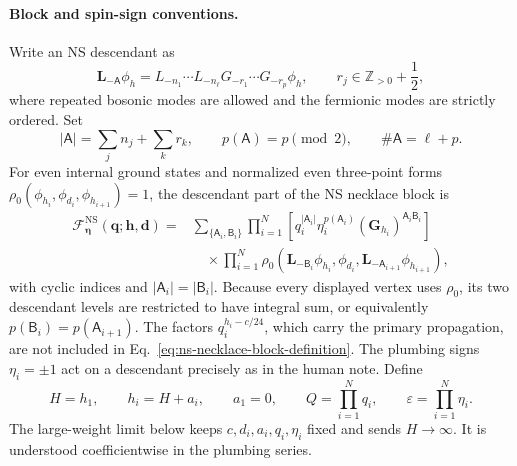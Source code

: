 \documentclass[11pt]{article}
\newcommand{\NS}{\mathrm{NS}}
\newcommand{\F}{\mathcal F}
\begin{document}
\paragraph{Block and spin-sign conventions.}
Write an NS descendant as
\begin{equation}
 \mathbf L_{-\mathsf A}\phi_h
 =L_{-n_1}\cdots L_{-n_\ell}
  G_{-r_1}\cdots G_{-r_p}\phi_h,
 \qquad
 r_j\in\mathbb Z_{>0}+\frac12,
 \label{eq:ns-necklace-pbw-state}
\end{equation}
where repeated bosonic modes are allowed and the fermionic modes are
strictly ordered.  Set
\begin{equation}
 |\mathsf A|=\sum_j n_j+\sum_k r_k,
 \qquad
 p(\mathsf A)=p\pmod2,
 \qquad
 \#\mathsf A=\ell+p.
\end{equation}
For even internal ground states and normalized even three-point forms
\(\rho_0(\phi_{h_i},\phi_{d_i},\phi_{h_{i+1}})=1\), the descendant part of
the NS necklace block is
\begin{equation}
 \begin{split}
 \F^{\NS}_{\boldsymbol\eta}
 (\boldsymbol q;\boldsymbol h,\boldsymbol d)
 ={}&
 \sum_{\{\mathsf A_i,\mathsf B_i\}}
 \prod_{i=1}^{N}
 \left[
 q_i^{|\mathsf A_i|}\eta_i^{p(\mathsf A_i)}
 (\mathbf G_{h_i})^{\mathsf A_i\mathsf B_i}
 \right]
 \\
 &\quad\times
 \prod_{i=1}^{N}
 \rho_0\!\left(
 \mathbf L_{-\mathsf B_i}\phi_{h_i},
 \phi_{d_i},
 \mathbf L_{-\mathsf A_{i+1}}\phi_{h_{i+1}}
 \right),
 \end{split}
 \label{eq:ns-necklace-block-definition}
\end{equation}
with cyclic indices and
\(|\mathsf A_i|=|\mathsf B_i|\).  Because every displayed vertex uses
\(\rho_0\), its two descendant levels are restricted to have integral sum,
or equivalently
\(p(\mathsf B_i)=p(\mathsf A_{i+1})\).  The factors
\(q_i^{h_i-c/24}\), which carry the primary propagation, are not included
in Eq.~\eqref{eq:ns-necklace-block-definition}.  The plumbing signs
\(\eta_i=\pm1\) act on a descendant precisely as in the human note.  Define
\begin{equation}
 H=h_1,\qquad h_i=H+a_i,\qquad a_1=0,\qquad
 Q=\prod_{i=1}^{N}q_i,\qquad
 \varepsilon=\prod_{i=1}^{N}\eta_i .
 \label{eq:ns-necklace-fixed-difference-data}
\end{equation}
The large-weight limit below keeps \(c,d_i,a_i,q_i,\eta_i\) fixed and sends
\(H\to\infty\).  It is understood coefficientwise in the plumbing series.
\end{document}

